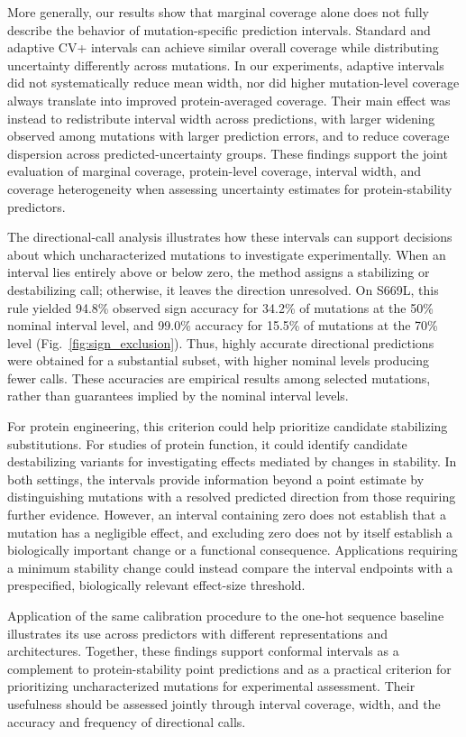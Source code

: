\documentclass[11pt]{article}
\begin{document}
More generally, our results show that marginal coverage alone does not fully describe
the behavior of mutation-specific prediction intervals. Standard and adaptive CV+
intervals can achieve similar overall coverage while distributing uncertainty
differently across mutations. In our experiments, adaptive intervals did not
systematically reduce mean width, nor did higher mutation-level coverage always
translate into improved protein-averaged coverage. Their main effect was instead to
redistribute interval width across predictions, with larger widening observed among
mutations with larger prediction errors, and to reduce coverage dispersion across
predicted-uncertainty groups. These findings support the joint evaluation of marginal
coverage, protein-level coverage, interval width, and coverage heterogeneity when
assessing uncertainty estimates for protein-stability predictors.

The directional-call analysis illustrates how these intervals can support decisions about which uncharacterized mutations to investigate experimentally.
When an interval lies entirely above or below zero, the method assigns a stabilizing
or destabilizing call; otherwise, it leaves the direction unresolved.
On S669L, this rule yielded 94.8\% observed sign accuracy for 34.2\% of mutations
at the 50\% nominal interval level, and 99.0\% accuracy for 15.5\% of mutations
at the 70\% level (Fig.~\ref{fig:sign_exclusion}).
Thus, highly accurate directional predictions were obtained for a substantial
subset, with higher nominal levels producing fewer calls.
These accuracies are empirical results among selected mutations, rather than
guarantees implied by the nominal interval levels.

For protein engineering, this criterion could help prioritize candidate stabilizing substitutions. For studies of protein function, it could identify candidate destabilizing variants for investigating effects mediated by changes in stability. In both settings, the intervals provide information beyond a point estimate by distinguishing mutations with a resolved predicted direction from those requiring further evidence. 
However, an interval containing zero does not establish that a mutation has a negligible effect, and excluding zero does not by itself establish a biologically important change or a functional consequence. 
Applications requiring a minimum stability change could instead compare the interval endpoints with a prespecified, biologically relevant effect-size threshold.

Application of the same calibration procedure to the one-hot sequence baseline illustrates its use across predictors with different representations and architectures. Together, these findings support conformal intervals as a complement to protein-stability point predictions and as a practical criterion for prioritizing uncharacterized mutations for experimental assessment.
Their usefulness should be assessed jointly through interval coverage, width, and the accuracy and frequency of directional calls.
\end{document}
